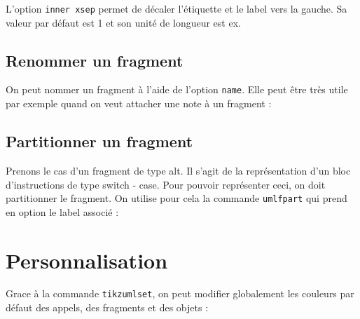 \documentclass[a4paper,11pt]{report}
\newcommand{\inputTikZ}[1]{%
  }%
\newcommand{\inputTikZ}[1]{%
    \texttt{[image: fig/\#1.pdf]}%
  }%
\begin{document}
\medskip

L'option {\tt inner xsep} permet de décaler l'étiquette et le label vers la gauche. Sa valeur par défaut est 1 et son unité de longueur est ex.

\subsection{Renommer un fragment}\label{ss.fragname}

On peut nommer un fragment à l'aide de l'option {\tt name}. Elle peut être très utile par exemple quand on veut attacher une note à un fragment :

\medskip

\begin{minipage}{0.5\textwidth}

\end{minipage}
\begin{minipage}{0.5\textwidth}
\begin{center}
\inputTikZ{figure78}
\end{center}
\end{minipage}

\subsection{Partitionner un fragment}\label{ss.fragpart}

Prenons le cas d'un fragment de type alt. Il s'agit de la représentation d'un bloc d'instructions de type switch - case. Pour pouvoir représenter ceci, on doit partitionner le fragment. On utilise pour cela la commande {\tt umlfpart} qui prend en option le label associé :

\medskip

\begin{minipage}{0.5\textwidth}

\end{minipage}
\begin{minipage}{0.5\textwidth}
\begin{center}
\inputTikZ{figure79}
\end{center}
\end{minipage}

\section{Personnalisation}\label{s.fitseq}

Grace à la commande {\tt tikzumlset}, on peut modifier globalement les couleurs par défaut des appels, des fragments et des objets :
\end{document}
